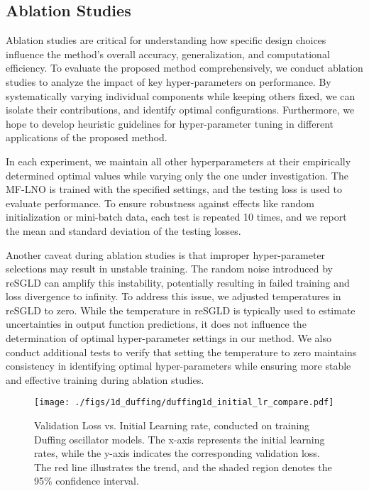 \subsection{Ablation Studies}

Ablation studies are critical for understanding how specific design choices influence the method's overall accuracy, generalization, and computational efficiency. To evaluate the proposed method comprehensively, we conduct ablation studies to analyze the impact of key hyper-parameters on performance. By systematically varying individual components while keeping others fixed, we can isolate their contributions, and identify optimal configurations. Furthermore, we hope to develop heuristic guidelines for hyper-parameter tuning in different applications of the proposed method.

In each experiment, we maintain all other hyperparameters at their empirically determined optimal values while varying only the one under investigation. The MF-LNO is trained with the specified settings, and the testing loss is used to evaluate performance. To ensure robustness against effects like random initialization or mini-batch data, each test is repeated 10 times, and we report the mean and standard deviation of the testing losses.

Another caveat during ablation studies is that improper hyper-parameter selections may result in unstable training. The random noise introduced by reSGLD can amplify this instability, potentially resulting in failed training and loss divergence to infinity. To address this issue, we adjusted temperatures in reSGLD to zero. While the temperature in reSGLD is typically used to estimate uncertainties in output function predictions, it does not influence the determination of optimal hyper-parameter settings in our method. We also conduct additional tests to verify that setting the temperature to zero maintains consistency in identifying optimal hyper-parameters while ensuring more stable and effective training during ablation studies.

\begin{figure}[!htbp]
    \centering
    \texttt{[image: ./figs/1d\_duffing/duffing1d\_initial\_lr\_compare.pdf]}
    \caption{Validation Loss vs. Initial Learning rate, conducted on training Duffing oscillator models. The x-axis represents the initial learning rates, while the y-axis indicates the corresponding validation loss. The red line illustrates the trend, and the shaded region denotes the 95\% confidence interval.}
    \label{fig:duffing_lr}
\end{figure}

